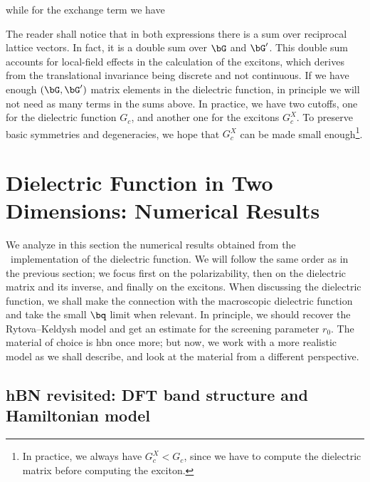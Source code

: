 \noindent while for the exchange term we have


\noindent The reader shall notice that in both expressions there is a sum over reciprocal lattice vectors.
In fact, it is a double sum over $\bG$ and $\bG'$.
This double sum accounts for local-field effects in the calculation of the excitons, which derives from the translational invariance being discrete and not continuous.
If we have enough $(\bG,\bG')$ matrix elements in the dielectric function, in principle we will not need as many terms in the sums above.
In practice, we have two cutoffs, one for the dielectric function $G_c$, and another one for the excitons $G^{X}_{c}$.
To preserve basic symmetries and degeneracies, we hope that $G^{X}_{c}$ can be made small enough\footnote{In practice, we always have $G^{X}_{c} < G_c$, since we have to compute the dielectric matrix before computing the exciton.}.

\section{Dielectric Function in Two Dimensions: Numerical Results}
\label{sec:dielectric_function_results}

We analyze in this section the numerical results obtained from the \bd~implementation of the dielectric function.
We will follow the same order as in the previous section; we focus first on the polarizability, then on the dielectric matrix and its inverse, and finally on the excitons.
When discussing the dielectric function, we shall make the connection with the macroscopic dielectric function and take the small $\bq$ limit when relevant.
In principle, we should recover the Rytova--Keldysh model and get an estimate for the screening parameter $r_0$.
The material of choice is \gls{hbn} once more; but now, we work with a more realistic model as we shall describe, and look at the material from a different perspective.

\subsection{hBN revisited: DFT band structure and Hamiltonian model}
\label{subsec:hBN_revisited}

